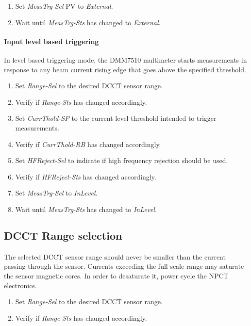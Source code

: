 \documentclass[openany]{article}
\begin{document}
			\begin{enumerate}
				\item Set \emph{MeasTrg-Sel} PV to \emph{External}.
				\item Wait until \emph{MeasTrg-Sts} has changed to \emph{External}.
			\end{enumerate}

		\paragraph{Input level based triggering} In level based triggering mode, the DMM7510 multimeter starts measurements in response to any beam current rising edge that goes above the specified threshold.

			\begin{enumerate}
				\item Set \emph{Range-Sel} to the desired DCCT sensor range.
				\item Verify if \emph{Range-Sts} has changed accordingly.
				\item Set \emph{CurrThold-SP} to the current level threshold intended to trigger measurements.
				\item Verify if \emph{CurrThold-RB} has changed accordingly.
				\item Set \emph{HFReject-Sel} to indicate if high frequency rejection should be used.
				\item Verify if \emph{HFReject-Sts} has changed accordingly.
				\item Set \emph{MeasTrg-Sel} to \emph{InLevel}.
				\item Wait until \emph{MeasTrg-Sts} has changed to \emph{InLevel}.
			\end{enumerate}

	\subsection{DCCT Range selection}

		\paragraph{} The selected DCCT sensor range should never be smaller than the current passing through the sensor. Currents exceeding the full scale range may saturate the sensor magnetic cores. In order to desaturate it, power cycle the NPCT electronics.

			\begin{enumerate}
				\item Set \emph{Range-Sel} to the desired DCCT sensor range.
				\item Verify if \emph{Range-Sts} has changed accordingly.
			\end{enumerate}
\end{document}
